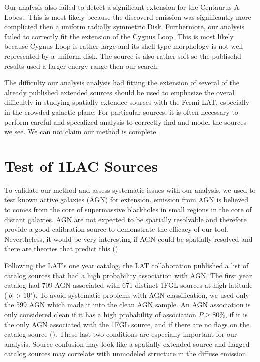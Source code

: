 \documentclass[12pt,preprint]{aastex}
\newcommand{\gev}{\text{GeV}\xspace}
\renewcommand{\deg}{\ensuremath{^\circ}\xspace}
\newcommand{\pointlike}{\text{\em pointlike}\xspace}
\begin{document}
Our analysis also failed to detect a significant extension for the
Centaurus A Lobes.\cite{CenA paper}. This is most likely because the
discoverd emission was significantly more complicted then a uniform
radially symmetric Disk.  Furthermore, our analysis failed to correctly
fit the extension of the Cygnus Loop\cite{Cygnus Loop Paper}.  This is
most likely because Cygnus Loop is rather large and its shell type
morphology is not well represented by a uniform disk. The source is
also rather soft so the publisehd results used a larger energy range
then our search.

The difficulty our analysis analysis had fitting the extension of several
of the already published extended sources should be used to emphasize the
overal difficultly in studying spatially extendee sources with the Fermi
LAT, especially in the crowded galactic plane. For particular sources,
it is often necessary to perform careful and specalized analysis to
correctly find and model the sources we see. We can not claim our method
is complete.

\section{Test of 1LAC Sources}

To validate our method and assess systematic issues with our analysis,
we used \pointlike to test known active galaxies (AGN) for extension.
\gev emission from AGN is believed to comes from the core of supermassive
blackholes in small regions in the core of distant galaxies.  AGN are
not expected to be spatially resolvable and therefore provide a good
calibration source to demonstrate the efficacy of our tool. Nevertheless,
it would be very interesting if AGN could be spatially resolved and
there are theories that predict this (\cite{pair_halo_paper}).

Following the LAT's one year catalog, the LAT collaboration published
a list of catalog sources that had a high probability association with
AGN. The first year catalog had 709 AGN associated with 671 distinct
1FGL sources at high latitude ($|b|>10\deg$).  To avoid systematic
problems with AGN classification, we used only the 599 AGN which made
it into the clean AGN sample.  An AGN association is only considered
clean if it has a high probability of association $P\ge 80\%$, if it is
the only AGN associated with the 1FGL source, and if there are no flags
on the catalog source (\cite{first_cat}). These last two conditions are
especially important for our analysis.  Source confusion may look like
a spatially extended source and flagged catalog sources may correlate
with unmodeled structure in the diffuse emission.
\end{document}
